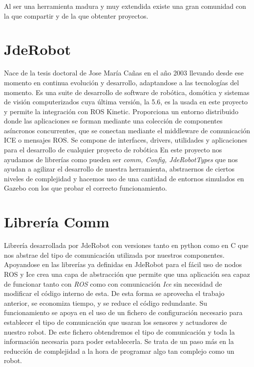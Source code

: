 Al ser una herramienta madura y muy extendida existe una gran comunidad con la que compartir y de la que obtenter proyectos.

\section{JdeRobot}
\label{sec:jderobot}

Nace de la tesis doctoral de Jose María Cañas en el año 2003 llevando desde ese momento en continua evolución y desarrollo, adaptandose a las tecnologías del momento.
Es una suite de desarrollo de software de robótica, domótica y sistemas de
visión computerizados cuya última versión, la 5.6, es la usada en este proyecto y permite la integración con ROS Kinetic. Proporciona un entorno distribuido donde las aplicaciones se forman mediante una colección de componentes asíncronos concurrentes, que se conectan mediante el middleware de comunicación ICE o mensajes ROS.
Se compone de interfaces, drivers, utilidades y aplicaciones para el desarrollo de cualquier proyecto de robótica
En este proyecto nos ayudamos de librerías como pueden ser \textit{comm, Config, JdeRobotTypes} que nos ayudan a agilizar el desarrollo de nuestra herramienta, abstraernos de ciertos niveles de complejidad y hacemos uso de una cantidad de entornos simulados en Gazebo con los que probar el correcto funcionamiento.


\section{Librería Comm}
\label{sec:libreria-com}

Librería desarrollada por JdeRobot con versiones tanto en python como en C que nos abstrae del tipo de comunicación utilizada por nuestros componentes.
Apoyandose en las librerías ya definidas en JdeRobot para el fácil uso de nodos ROS y Ice crea una capa de abstracción que permite que una aplicación sea capaz de funcionar tanto con \textit{ROS} como con comunicación \textit{Ice} sin necesidad de modificar el código interno de esta. De esta forma se aprovecha el trabajo anterior, se economiza tiempo, y se reduce el código redundante.
Su funcionamiento se apoya en el uso de un fichero de configuración necesario para establecer el tipo de comunicación que usaran los sensores y actuadores de nuestro robot. De este fichero obtendremos el tipo de comunicación y toda la información necesaria para poder establecerla. 
Se trata de un paso más en la reducción de complejidad a la hora de programar algo tan complejo como un robot.


